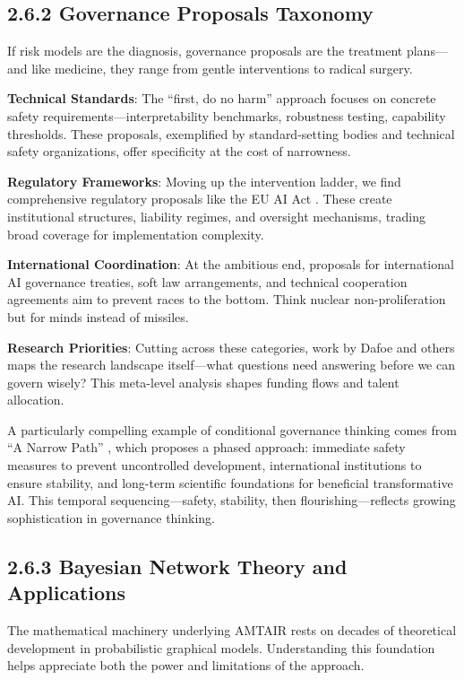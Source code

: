 \documentclass[
  11pt,
  letterpaper,
  openany]{book}
\begin{document}
\subsection{2.6.2 Governance Proposals
Taxonomy}\label{sec-governance-taxonomy}

If risk models are the diagnosis, governance proposals are the treatment
plans---and like medicine, they range from gentle interventions to
radical surgery.

\textbf{Technical Standards}: The ``first, do no harm'' approach focuses
on concrete safety requirements---interpretability benchmarks,
robustness testing, capability thresholds. These proposals, exemplified
by standard-setting bodies and technical safety organizations, offer
specificity at the cost of narrowness.

\textbf{Regulatory Frameworks}: Moving up the intervention ladder, we
find comprehensive regulatory proposals like the EU AI Act
\textcite{european2024}. These create institutional structures,
liability regimes, and oversight mechanisms, trading broad coverage for
implementation complexity.

\textbf{International Coordination}: At the ambitious end, proposals for
international AI governance treaties, soft law arrangements, and
technical cooperation agreements aim to prevent races to the bottom.
Think nuclear non-proliferation but for minds instead of missiles.

\textbf{Research Priorities}: Cutting across these categories, work by
Dafoe \textcite{dafoe2018} and others maps the research landscape
itself---what questions need answering before we can govern wisely? This
meta-level analysis shapes funding flows and talent allocation.

A particularly compelling example of conditional governance thinking
comes from ``A Narrow Path'' \textcite{miotti2024}, which proposes a
phased approach: immediate safety measures to prevent uncontrolled
development, international institutions to ensure stability, and
long-term scientific foundations for beneficial transformative AI. This
temporal sequencing---safety, stability, then flourishing---reflects
growing sophistication in governance thinking.

\subsection{2.6.3 Bayesian Network Theory and
Applications}\label{sec-bn-theory}

The mathematical machinery underlying AMTAIR rests on decades of
theoretical development in probabilistic graphical models. Understanding
this foundation helps appreciate both the power and limitations of the
approach.
\end{document}
